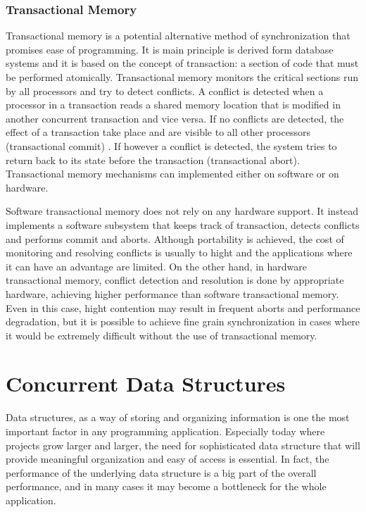 \subsubsection{Transactional Memory}

Transactional memory is a potential alternative method of synchronization that promises ease of programming. It is main principle is derived form database systems and it is based on the concept of transaction: a section of code that must be performed atomically. Transactional memory monitors the critical sections run by all processors and try to detect conflicts. A conflict is detected when a processor in a transaction reads a shared memory location that is modified in another concurrent transaction and vice versa. If no conflicts are detected, the effect of a transaction take place and are visible to all other processors (transactional commit) . If however a conflict is detected, the system tries to return back to its state before the transaction (transactional abort). Transactional memory mechanisms can implemented either on software or on hardware.

Software transactional memory does not rely on any hardware support. It instead implements a software subsystem that keeps track of transaction, detects conflicts and performs commit and aborts. Although portability is achieved, the cost of monitoring and resolving conflicts is usually to hight and the applications where it can have an advantage are limited. On the other hand, in hardware transactional memory, conflict detection and resolution is done by appropriate hardware, achieving higher performance than software transactional memory. Even in this case, hight contention may result in frequent aborts and performance degradation, but it is possible to achieve fine grain synchronization in cases where it would be extremely difficult without the use of transactional memory. 

\section{Concurrent Data Structures}

Data structures, as a way of storing and organizing information is one the most important factor in any programming application. Especially today where projects grow larger and larger, the need for sophisticated data structure that will provide meaningful organization and easy of access is essential. In fact, the performance of the underlying data structure is a big part of the overall performance, and in many cases it may become a bottleneck for the whole application.

